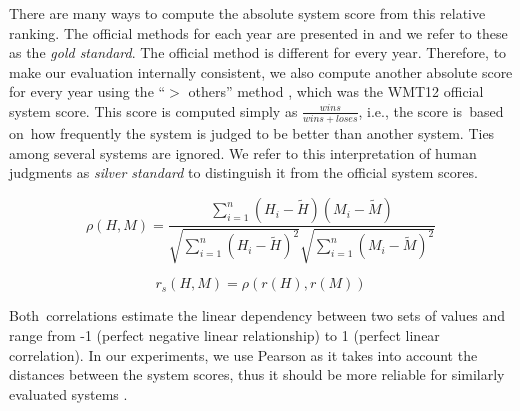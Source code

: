 There are many ways to compute the absolute system score from this relative
ranking. The official methods for each year are presented in  
and we refer to these as the \textit{gold standard}. The official method is
different for every year. Therefore, to make our evaluation internally 
consistent, we also compute another absolute score for every year using the 
“$ >$ others” method \citep{bojar-grains}, which was the WMT12 official system
score. This score is computed simply as $\frac{wins}{wins+loses} $, i.e., the 
score is~based on~how frequently the system is judged to be better than 
another system. Ties among several systems are ignored. We refer to this 
interpretation of human judgments as \textit{silver standard} to distinguish
it from the official system scores. %



\begin{equation*}
\rho(H,M) = \frac{ \sum_{i=1}^{n}{(H_i - \tilde{H})(M_i - \tilde{M})}}{ \sqrt{ \sum_{i=1}^{n}{(H_i - \tilde{H})^2} }  \sqrt{ \sum_{i=1}^{n}{(M_i - \tilde{M})^2} } } 
\end{equation*}



\begin{equation*}
r_{s}(H,M) = \rho(r(H),r(M))
\end{equation*}

Both~correlations estimate the linear dependency between two sets of values and 
range from -1 (perfect negative linear relationship) to 1 (perfect linear correlation). 
In our experiments, we use Pearson as it takes into account the distances between 
the system scores, thus it should be more reliable for similarly evaluated systems 
\citep{machacek-bojar-2014-results}. 

